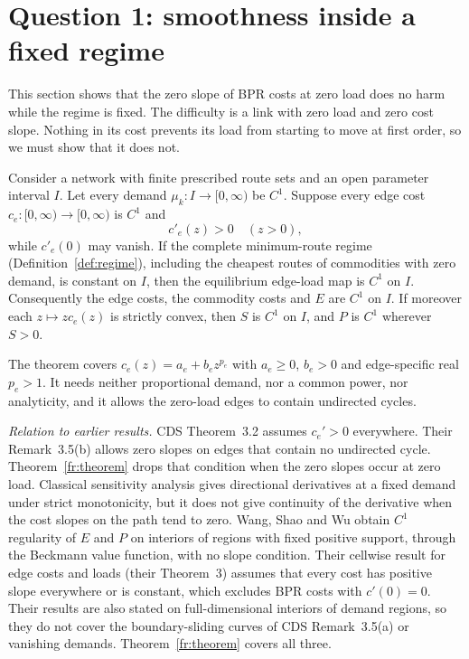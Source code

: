 \section{Question 1: smoothness inside a fixed regime}\label{fr:section}

This section shows that the zero slope of BPR costs at zero load does no harm while the regime is fixed. The difficulty is a link with zero load and zero cost slope. Nothing in its cost prevents its load from starting to move at first order, so we must show that it does not.

\begin{theorem}\label{fr:theorem}
Consider a network with finite prescribed route sets and an open parameter interval $I$. Let every demand $\mu_k:I\to[0,\infty)$ be $C^1$. Suppose every edge cost $c_e:[0,\infty)\to[0,\infty)$ is $C^1$ and
\[
 c'_e(z)>0\quad(z>0),
\]
while $c'_e(0)$ may vanish. If the complete minimum-route regime (Definition~\ref{def:regime}), including the cheapest routes of commodities with zero demand, is constant on $I$, then the equilibrium edge-load map is $C^1$ on $I$. Consequently the edge costs, the commodity costs and $E$ are $C^1$ on $I$. If moreover each $z\mapsto zc_e(z)$ is strictly convex, then $S$ is $C^1$ on $I$, and $P$ is $C^1$ wherever $S>0$.
\end{theorem}

The theorem covers $c_e(z)=a_e+b_ez^{p_e}$ with $a_e\ge0$, $b_e>0$ and edge-specific real $p_e>1$. It needs neither proportional demand, nor a common power, nor analyticity, and it allows the zero-load edges to contain undirected cycles.

\emph{Relation to earlier results.} CDS Theorem~3.2 assumes $c_e'>0$ everywhere. Their Remark~3.5(b) allows zero slopes on edges that contain no undirected cycle. Theorem~\ref{fr:theorem} drops that condition when the zero slopes occur at zero load. Classical sensitivity analysis \cite{TobinFriesz1988,QiuMagnanti1989,Patriksson2004,Lu2008} gives directional derivatives at a fixed demand under strict monotonicity, but it does not give continuity of the derivative when the cost slopes on the path tend to zero. Wang, Shao and Wu \cite{WSW2026} obtain $C^1$ regularity of $E$ and $P$ on interiors of regions with fixed positive support, through the Beckmann value function, with no slope condition. Their cellwise result for edge costs and loads (their Theorem~3) assumes that every cost has positive slope everywhere or is constant, which excludes BPR costs with $c'(0)=0$. Their results are also stated on full-dimensional interiors of demand regions, so they do not cover the boundary-sliding curves of CDS Remark~3.5(a) or vanishing demands. Theorem~\ref{fr:theorem} covers all three.


